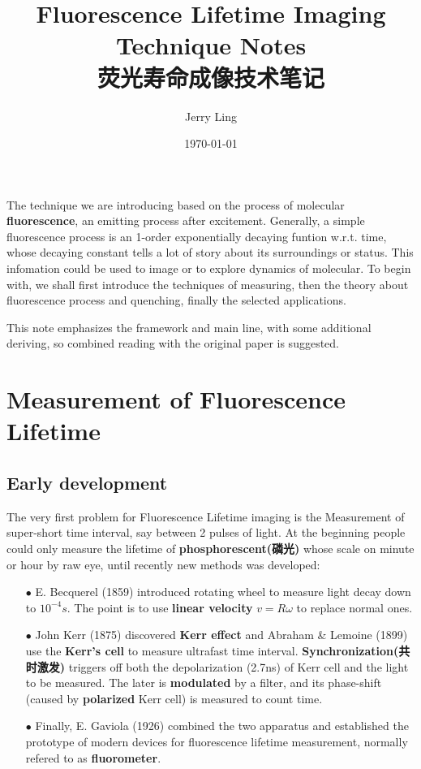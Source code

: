 \documentclass[12pt]{ctexart}
\title{Fluorescence Lifetime Imaging Technique Notes\\荧光寿命成像技术笔记}
\author{Jerry Ling}
\date{\today}
\begin{document}
\maketitle  %
The technique we are introducing based on the process of molecular \textbf{fluorescence}, an emitting process after excitement. Generally, a simple fluorescence process is an 1-order exponentially decaying funtion w.r.t. time, whose decaying constant tells a lot of story about its surroundings or status. This infomation could be used to image or to explore dynamics of molecular. To begin with, we shall first introduce the techniques of measuring, then the theory about fluorescence process and quenching, finally the selected applications. 
\begin{framed}
    This note emphasizes the framework and main line, with some additional deriving, so combined reading with the original paper is suggested. 
\end{framed}
\section{Measurement of Fluorescence Lifetime}
\subsection*{Early development}
\par The very first problem for Fluorescence Lifetime imaging is the Measurement of super-short time interval, say between 2 pulses of light. At the beginning people could only measure the lifetime of \textbf{phosphorescent(磷光)} whose scale on minute or hour by raw eye, until recently new methods was developed:
\begin{itemize}
    \item [$\bullet$] E. Becquerel (1859) introduced rotating wheel to measure light decay down to $10^{-4}s$. The point is to use \textbf{linear velocity} $v=R\omega$ to replace normal ones. 
    \item [$\bullet$] John Kerr (1875) discovered \textbf{Kerr effect} and Abraham \& Lemoine (1899) use the \textbf{Kerr’s cell} to measure ultrafast time interval. \textbf{Synchronization(共时激发)} triggers off both the depolarization (2.7ns) of Kerr cell and the light to be measured. The later is \textbf{modulated} by a filter, and its phase-shift (caused by \textbf{polarized} Kerr cell) is measured to count time. 
    \item [$\bullet$] Finally, E. Gaviola (1926) combined the two apparatus and established the prototype of modern devices for fluorescence lifetime measurement, normally refered to as \textbf{fluorometer}.
\end{itemize}
\end{document}
